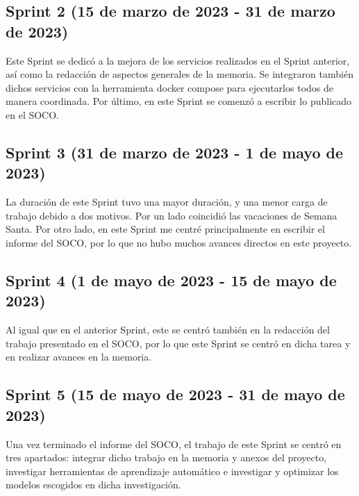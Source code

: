 
\subsection{Sprint 2 (15 de marzo de 2023 - 31 de marzo de 2023)}

Este Sprint se dedicó a la mejora de los servicios realizados en el Sprint anterior, así como la redacción de aspectos 
generales de la memoria. Se integraron también dichos servicios con la herramienta docker compose para ejecutarlos todos 
de manera coordinada. Por último, en este Sprint se comenzó a escribir lo publicado en el SOCO.


\subsection{Sprint 3 (31 de marzo de 2023 - 1 de mayo de 2023)}

La duración de este Sprint tuvo una mayor duración, y una menor carga de trabajo debido a dos motivos. Por un lado
coincidió las vacaciones de Semana Santa. Por otro lado, en este Sprint me centré principalmente en escribir el informe 
del SOCO, por lo que no hubo muchos avances directos en este proyecto.


\subsection{Sprint 4 (1 de mayo de 2023 - 15 de mayo de 2023)}

Al igual que en el anterior Sprint, este se centró también en la redacción del trabajo presentado en el SOCO, por lo 
que este Sprint se centró en dicha tarea y en realizar avances en la memoria.


\subsection{Sprint 5 (15 de mayo de 2023 - 31 de mayo de 2023)}

Una vez terminado el informe del SOCO, el trabajo de este Sprint se centró en tres apartados: integrar dicho trabajo 
en la memoria y anexos del proyecto, investigar herramientas de aprendizaje automático e investigar y optimizar 
los modelos escogidos en dicha investigación.

